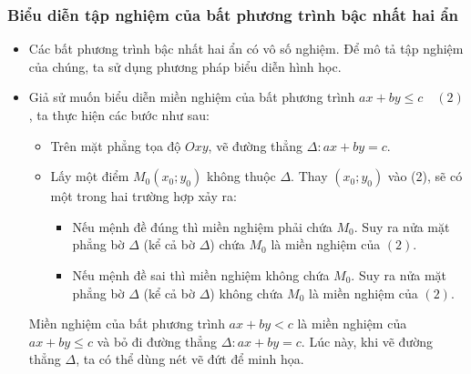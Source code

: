 \subsubsection{Biểu diễn tập nghiệm của bất phương trình bậc nhất hai ẩn}
\begin{itemize}
	\item [\iconCH] Các bất phương trình bậc nhất hai ẩn có vô số nghiệm. Để mô tả tập nghiệm của chúng, ta sử dụng phương pháp biểu diễn hình học.
	\item [\iconCH] Giả sử muốn biểu diễn miền nghiệm của bất phương trình $ax+by \le c \quad(2)$, ta thực hiện các bước như sau:
	\begin{boxdn}
		\begin{itemize}
			\item [\ding{172}] Trên mặt phẳng tọa độ $Oxy$, vẽ đường thẳng $\Delta \colon ax+by=c$.
			\item [\ding{173}] Lấy một điểm $M_0\left(x_0;y_0\right)$ không thuộc $\Delta$. Thay $(x_0;y_0)$ vào (2), sẽ có một trong hai trường hợp xảy ra: 
			\begin{itemize}
				\item Nếu mệnh đề đúng thì miền nghiệm phải chứa $M_0$. Suy ra nửa mặt phẳng bờ $\Delta$ (kể cả bờ $\Delta$) chứa $M_0$ là miền nghiệm của $(2)$.
				\item Nếu mệnh đề sai thì miền nghiệm không chứa $M_0$. Suy ra nửa mặt phẳng bờ $\Delta$ (kể cả bờ $\Delta$) không chứa $M_0$ là miền nghiệm của $(2)$.
			\end{itemize}
		\end{itemize}
	\end{boxdn}
\begin{note}
	Miền nghiệm của bất phương trình $ax+by<c$ là miền nghiệm của $ax+by \le c$ và bỏ đi đường thẳng $\Delta \colon ax+by=c$. Lúc này, khi vẽ đường thẳng $\Delta$, ta có thể dùng nét vẽ đứt để minh họa.
\end{note}
\end{itemize}
